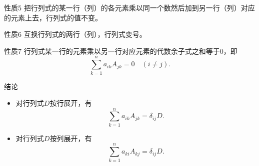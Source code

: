 \begin{frame}
  \begin{block}{性质5}
    把行列式的某一行（列）的各元素乘以同一个数然后加到另一行（列）对应的元素上去，行列式的值不变。
  \end{block}

  \begin{block}{性质6}
    互换行列式的两行（列），行列式变号。
  \end{block}
\end{frame}

\begin{frame}
  \begin{block}{性质7}
    行列式某一行的元素乘以另一行对应元素的代数余子式之和等于$0$，即
    $$
    \sum_{k=1}^n a_{ik} A_{jk}  = 0 \quad (i\ne j).
    $$
  \end{block}


  \begin{block}{结论}
    \begin{itemize}
    \item 对行列式$D$按行展开，有
      $$
      \sum_{k=1}^n a_{ik} A_{jk} = \delta_{ij} D.
      $$
      
    \item 对行列式$D$按列展开，有
      $$
      \sum_{k=1}^n a_{ki} A_{kj} = \delta_{ij} D.
      $$
    \end{itemize}
  \end{block}

\end{frame}

